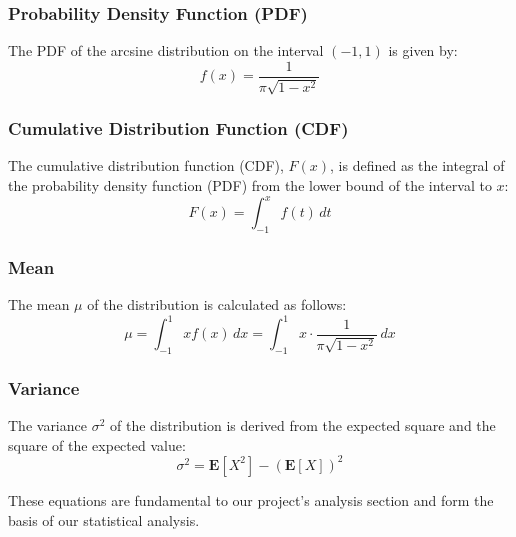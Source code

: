 \subsubsection{Probability Density Function (PDF)}
The PDF of the arcsine distribution on the interval \((-1, 1)\) is given by:
\begin{equation}
f(x) = \frac{1}{\pi \sqrt{1-x^2}}
\end{equation}

\subsubsection{Cumulative Distribution Function (CDF)}
The cumulative distribution function (CDF), \( F(x) \), is defined as the integral of the probability density function (PDF) from the lower bound of the interval to \( x \):
\begin{equation}
F(x) = \int_{-1}^{x} f(t) \, dt
\end{equation}

\subsubsection{Mean}
The mean \(\mu\) of the distribution is calculated as follows:
\begin{equation}
\mu = \int_{-1}^{1} x f(x) \, dx = \int_{-1}^{1} x \cdot \frac{1}{\pi \sqrt{1-x^2}} \, dx
\end{equation}

\subsubsection{Variance}
The variance \(\sigma^2\) of the distribution is derived from the expected square and the square of the expected value:
\begin{equation}
\sigma^2 = \mathbf{E}[X^2] - (\mathbf{E}[X])^2
\end{equation}

These equations are fundamental to our project's analysis section and form the basis of our statistical analysis.

\pagebreak
